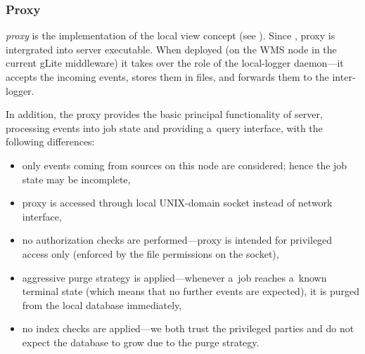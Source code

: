 
\subsubsection{Proxy}

\emph{\LB proxy} is the implementation of the local view concept (see
\ifx\insideUG{}\fi). Since
\LBnew, \LB proxy is intergrated into \LB server executable.  When deployed (on
the WMS node in the current gLite middleware) it takes over the role of the
local-logger daemon---it accepts the incoming events, stores them in files, and
forwards them to the inter-logger.

In addition, the proxy provides the basic principal functionality of \LB server,
\ie processing events into job state and providing a~query interface,
with the following differences:
\begin{itemize}
\item only events coming from sources on this node are considered; hence
the job state may be incomplete,
\item proxy is accessed through local UNIX-domain socket instead of network
interface,
\item no authorization checks are performed---proxy is intended for
privileged access only (enforced by the file permissions on the socket),
\item aggressive purge strategy is applied---whenever a~job reaches
a~known terminal state (which means that no further events are expected), it is purged
from the local database immediately,
\item no index checks are applied---we both trust the privileged parties
and do not expect the database to grow due to the purge strategy.
\end{itemize}


